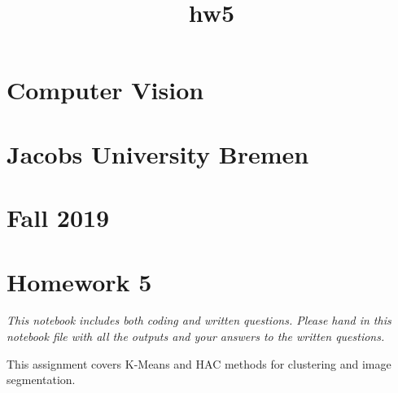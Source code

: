 \documentclass[11pt]{article}
\title{hw5}
\begin{document}
    
    
    \maketitle
    
    

    
    \hypertarget{computer-vision}{%
\section{Computer Vision}\label{computer-vision}}

\hypertarget{jacobs-university-bremen}{%
\section{Jacobs University Bremen}\label{jacobs-university-bremen}}

\hypertarget{fall-2019}{%
\section{Fall 2019}\label{fall-2019}}

\hypertarget{homework-5}{%
\section{Homework 5}\label{homework-5}}

\emph{This notebook includes both coding and written questions. Please
hand in this notebook file with all the outputs and your answers to the
written questions.}

This assignment covers K-Means and HAC methods for clustering and image
segmentation.
\end{document}
